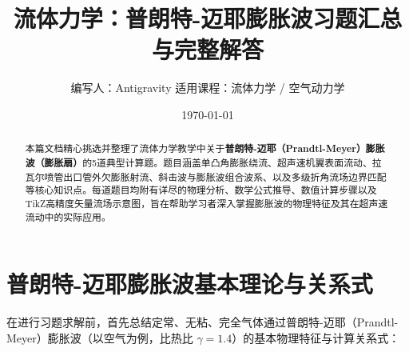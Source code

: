 \documentclass[11pt,a4paper]{ctexart}
\title{\Huge \textbf{流体力学：普朗特-迈耶膨胀波习题汇总与完整解答}}
\author{\large 编写人：Antigravity \quad 适用课程：流体力学 / 空气动力学}
\date{\today}
\begin{document}
\maketitle

\begin{abstract}
本篇文档精心挑选并整理了流体力学教学中关于\textbf{普朗特-迈耶（Prandtl-Meyer）膨胀波（膨胀扇）}的5道典型计算题。题目涵盖单凸角膨胀绕流、超声速机翼表面流动、拉瓦尔喷管出口管外欠膨胀射流、斜击波与膨胀波组合波系、以及多级折角流场边界匹配等核心知识点。每道题目均附有详尽的物理分析、数学公式推导、数值计算步骤以及TikZ高精度矢量流场示意图，旨在帮助学习者深入掌握膨胀波的物理特征及其在超声速流动中的实际应用。
\end{abstract}

\tableofcontents
\newpage

\section{普朗特-迈耶膨胀波基本理论与关系式}
在进行习题求解前，首先总结定常、无粘、完全气体通过普朗特-迈耶（Prandtl-Meyer）膨胀波（以空气为例，比热比 $\gamma = 1.4$）的基本物理特征与计算关系式：
\end{document}
